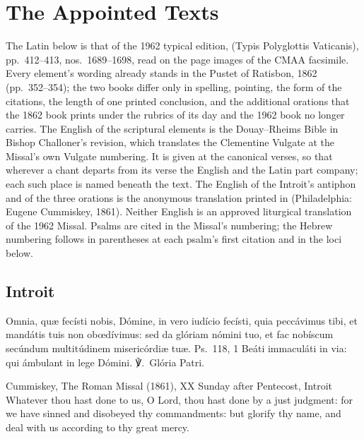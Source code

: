 \section{The Appointed Texts}
\label{sec:appointed-texts}

The Latin below is that of the 1962 typical edition, 
(Typis Polyglottis Vaticanis), pp.~412--413, nos.~1689--1698, read on the page
images of the CMAA facsimile. Every element's wording already stands in the
Pustet  of Ratisbon, 1862 (pp.~352--354); the two books
differ only in spelling, pointing, the form of the citations, the length of one
printed conclusion, and the additional orations that the 1862 book prints under
the rubrics of its day and the 1962 book no longer carries. The English of the
scriptural elements is the Douay--Rheims Bible in Bishop Challoner's revision,
which translates the Clementine Vulgate at the Missal's own Vulgate numbering.
It is given at the canonical verses, so that wherever a chant departs from its
verse the English and the Latin part company; each such place is named beneath
the text. The English of the Introit's antiphon and of the three orations is
the anonymous translation printed in  (Philadelphia: Eugene Cummiskey,
1861). Neither English is an approved liturgical translation of the 1962
Missal. Psalms are cited in the Missal's numbering; the Hebrew numbering
follows in parentheses at each psalm's first citation and in the loci below.

\subsection{Introit}
\label{proper-introit}


\begin{latinproper}
Omnia, quæ fecísti nobis, Dómine, in vero iudício fecísti, quia peccávimus
tibi, et mandátis tuis non obœdívimus: sed da glóriam nómini tuo, et fac
nobíscum secúndum multitúdinem misericórdiæ tuæ. \textnormal{Ps.\ 118, 1}
Beáti immaculáti in via: qui ámbulant in lege Dómini. ℣.~Glória Patri.
\end{latinproper}

\begin{englishwitness}{Cummiskey, The Roman Missal (1861), XX Sunday after Pentecost, Introit}
Whatever thou hast done to us, O Lord, thou hast done by a just judgment: for
we have sinned and disobeyed thy commandments: but glorify thy name, and deal
with us according to thy great mercy.
\end{englishwitness}

